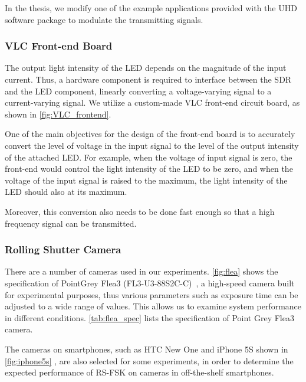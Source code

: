 In the thesis, we modify one of the example applications provided with the UHD software package to modulate the transmitting signals.

\subsubsection{VLC Front-end Board}

The output light intensity of the LED depends on the magnitude of the input current. Thus, a hardware component is required to interface between the SDR and the LED component, linearly converting a voltage-varying signal to a current-varying signal. We utilize a custom-made VLC front-end circuit board, as shown in \autoref{fig:VLC_frontend}. 

One of the main objectives for the design of the front-end board is to accurately convert the level of voltage in the input signal to the level of the output intensity of the attached LED. 
For example, when the voltage of input signal is zero, the front-end would control the light intensity of the LED to be zero, and when the voltage of the input signal is raised to the maximum, the light intensity of the LED should also at its maximum. 

Moreover, this conversion also needs to be done fast enough so that a high frequency signal can be transmitted. 

\subsubsection{Rolling Shutter Camera}
There are a number of cameras used in our experiments. 
 \autoref{fig:flea} shows the specification of PointGrey Flea3 (FL3-U3-88S2C-C)~\cite{pointgrey_flea}, a high-speed camera built for experimental purposes, thus various parameters such as exposure time can be adjusted to a wide range of values. This allows us to examine system performance in different conditions. 
 \autoref{tab:flea_spec} lists the specification of Point Grey Flea3 camera.

The cameras on smartphones, such as HTC New One and iPhone 5S shown in \autoref{fig:iphone5s} , are also selected for some experiments, in order to determine the expected performance of RS-FSK on cameras in off-the-shelf smartphones. 

